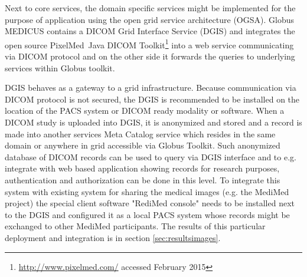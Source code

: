Next to core services, the domain specific services might be implemented for the purpose of application using the open grid service architecture (OGSA). Globus MEDICUS \cite{Erberich2006,Erberich2007} contains a DICOM Grid Interface Service (DGIS) and integrates the open source PixelMed\texttrademark ~Java DICOM Toolkit\footnote{\url{http://www.pixelmed.com/} accessed February 2015} into a web service communicating via DICOM protocol and on the other side it forwards the queries to underlying services within Globus toolkit. 

DGIS behaves as a gateway to a grid infrastructure. Because communication via DICOM protocol is not secured, the DGIS is recommended to be installed on the location of the PACS system or DICOM ready modality or software.
When a DICOM study is uploaded into DGIS, it is anonymized and stored and a record is made into another services Meta Catalog service which resides in the same domain or anywhere in grid accessible via Globus Toolkit.
Such anonymized database of DICOM records can be used to query via DGIS interface and to e.g. integrate with web based application showing records for research purposes, authentication and authorization can be done in this level. 
To integrate this system with existing system for sharing the medical images (e.g. the MediMed project\cite{Slavicek2010}) the special client software "RediMed console" needs to be installed next to the DGIS and configured it as a local PACS system whose records might be exchanged to other MediMed participants. 
The results of this particular deployment and integration is in section \ref{sec:resultsimages}.






